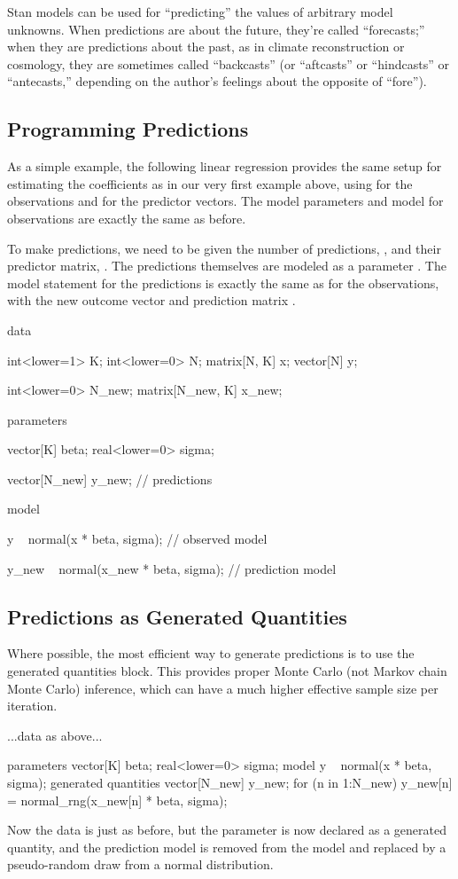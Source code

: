 Stan models can be used for ``predicting'' the values of arbitrary
model unknowns.  When predictions are about the future, they're called
``forecasts;'' when they are predictions about the past, as in climate
reconstruction or cosmology, they are sometimes called ``backcasts''
(or ``aftcasts'' or ``hindcasts'' or ``antecasts,'' depending on the
author's feelings about the opposite of ``fore'').

\subsection{Programming Predictions}

As a simple example, the following linear regression provides the same
setup for estimating the coefficients  as in our very first
example above, using  for the  observations and
 for the  predictor vectors.  The model parameters and
model for observations are exactly the same as before.

To make predictions, we need to be given the number of predictions,
, and their predictor matrix, .  The
predictions themselves are modeled as a parameter .  The
model statement for the predictions is exactly the same as for the
observations, with the new outcome vector  and prediction
matrix .
%
\begin{stancode}
data {
  int<lower=1> K;
  int<lower=0> N;
  matrix[N, K] x;
  vector[N] y;

  int<lower=0> N_new;
  matrix[N_new, K] x_new;
}
parameters {
  vector[K] beta;
  real<lower=0> sigma;

  vector[N_new] y_new;                  // predictions
}
model {
  y ~ normal(x * beta, sigma);          // observed model

  y_new ~ normal(x_new * beta, sigma);  // prediction model
}
\end{stancode}


\subsection{Predictions as Generated Quantities}

Where possible, the most efficient way to generate predictions is to
use the generated quantities block.  This provides proper Monte Carlo
(not Markov chain Monte Carlo) inference, which can have a much higher
effective sample size per iteration.
%
\begin{stancode}
...data as above...

parameters {
  vector[K] beta;
  real<lower=0> sigma;
}
model {
  y ~ normal(x * beta, sigma);
}
generated quantities {
  vector[N_new] y_new;
  for (n in 1:N_new)
    y_new[n] = normal_rng(x_new[n] * beta, sigma);
}
\end{stancode}
%
Now the data is just as before, but the parameter  is now
declared as a generated quantity, and the prediction model is
removed from the model and replaced by a pseudo-random draw from a
normal distribution.

